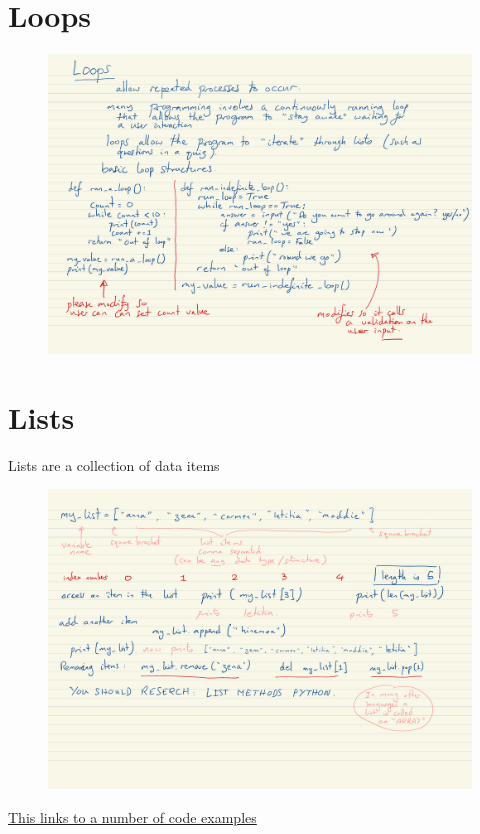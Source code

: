 \documentclass[a4paper,12pt]{article}
\begin{document}
\section{Loops} 
\begin{figure}[!ht]
	\centering
	\includegraphics[width=15cm]{loops.pdf}
\end{figure}
\newpage
\section{Lists}
Lists are a collection of data items

\begin{figure}[!ht]
	\centering
	\includegraphics[width=15cm]{lists.pdf}
\end{figure}

\hyperlink{Lists}{This links to a number of code examples}
\end{document}
